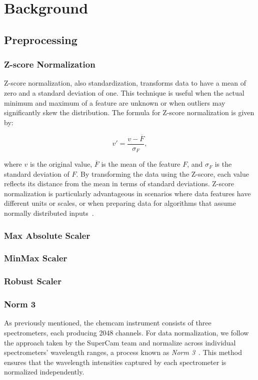 \section{Background}\label{sec:background}
\subsection{Preprocessing}

\subsubsection{Z-score Normalization}
Z-score normalization, also standardization, transforms data to have a mean of zero and a standard deviation of one.
This technique is useful when the actual minimum and maximum of a feature are unknown or when outliers may significantly skew the distribution.
The formula for Z-score normalization is given by:

$$ 
v' = \frac{v - \overline{F}}{\sigma_F},
$$

where $v$ is the original value, $\overline{F}$ is the mean of the feature $F$, and $\sigma_F$ is the standard deviation of $F$. 
By transforming the data using the Z-score, each value reflects its distance from the mean in terms of standard deviations.
Z-score normalization is particularly advantageous in scenarios where data features have different units or scales, or when preparing data for algorithms that assume normally distributed inputs~\cite{dataminingConcepts}.

\subsubsection{Max Absolute Scaler}

\subsubsection{MinMax Scaler}

\subsubsection{Robust Scaler}

\subsubsection{Norm 3}
As previously mentioned, the \gls{chemcam} instrument consists of three spectrometers, each producing 2048 channels.
For data normalization, we follow the approach taken by the SuperCam team and normalize across individual spectrometers' wavelength ranges, a process known as \textit{Norm 3}~\cite{andersonPostlandingMajorElement2022}.
This method ensures that the wavelength intensities captured by each spectrometer is normalized independently.


